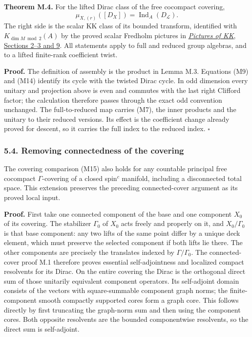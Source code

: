 \documentclass[
  11pt,
]{article}
\begin{document}
\textbf{Theorem M.4.} For the lifted Dirac class of the free cocompact
covering, \[
\mu_{X,(r)}([D_X])=\operatorname{Ind}_A(D_{\mathcal L}).
\tag{M15}
\] The right side is the scalar KK class of its bounded transform,
identified with \(K_{\dim M\bmod2}(A)\) by the proved scalar Fredholm
pictures in
\href{KT-KK-07.html\#2-the-even-scalar-fredholm-picture}{\emph{Pictures
of KK}, Sections 2--3 and 9}. All statements apply to full and reduced
group algebras, and to a lifted finite-rank coefficient twist.

\textbf{Proof.} The definition of assembly is the product in Lemma M.3.
Equations (M9) and (M14) identify its cycle with the twisted Dirac
cycle. In odd dimension every unitary and projection above is even and
commutes with the last right Clifford factor; the calculation therefore
passes through the exact odd convention unchanged. The full-to-reduced
map carries (M7), the inner products and the unitary to their reduced
versions. Its effect is the coefficient change already proved for
descent, so it carries the full index to the reduced index. \(\square\)

\subsubsection{5.4. Removing connectedness of the
covering}\label{removing-connectedness-of-the-covering}

The covering comparison (M15) also holds for any countable principal
free cocompact \(\Gamma\)-covering of a closed spin\(^{c}\) manifold,
including a disconnected total space. This extension preserves the
preceding connected-cover argument as its proved local input.

\textbf{Proof.} First take one connected component of the base and one
component \(X_0\) of its covering. The stabilizer \(\Gamma_0\) of
\(X_0\) acts freely and properly on it, and \(X_0/\Gamma_0\) is that
base component: any two lifts of the same point differ by a unique deck
element, which must preserve the selected component if both lifts lie
there. The other components are precisely the translates indexed by
\(\Gamma/\Gamma_0\). The connected-cover proof M.1 therefore proves
essential self-adjointness and localized compact resolvents for its
Dirac. On the entire covering the Dirac is the orthogonal direct sum of
those unitarily equivalent component operators. Its self-adjoint domain
consists of the vectors with square-summable component graph norms; the
finite-component smooth compactly supported cores form a graph core.
This follows directly by first truncating the graph-norm sum and then
using the component cores. Both opposite resolvents are the bounded
componentwise resolvents, so the direct sum is self-adjoint.
\end{document}
